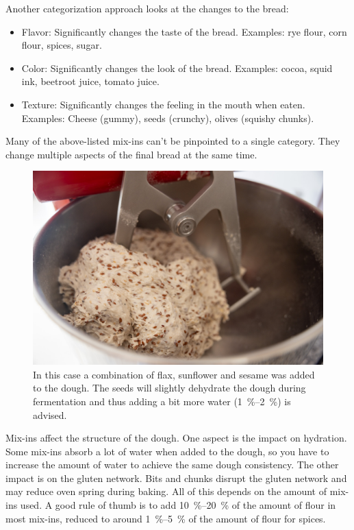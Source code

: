 Another categorization approach looks at the changes to the bread:

\begin{itemize}
  \item Flavor: Significantly changes the taste of the bread. Examples: rye
      flour, corn flour, spices, sugar.
  \item Color: Significantly changes the look of the bread. Examples: cocoa,
      squid ink, beetroot juice, tomato juice.
  \item Texture: Significantly changes the feeling in the mouth when eaten.
      Examples: Cheese (gummy), seeds (crunchy), olives (squishy chunks).
\end{itemize}

Many of the above-listed mix-ins can't be pinpointed to a single category. They
change multiple aspects of the final bread at the same time.

\begin{figure}[htb!]
  \includegraphics[width=\textwidth]{seeded-sourdough}
  \caption[Seeded sourdough]{In this case a combination of flax, sunflower and
    sesame was added to the dough. The seeds will slightly dehydrate the dough
    during fermentation and thus adding a bit more water (\qtyrange{1}{2}{\percent}) is advised.}%
\end{figure}

Mix-ins affect the structure of the dough. One aspect is the impact on
hydration. Some mix-ins absorb a lot of water when added to the dough, so you
have to increase the amount of water to achieve the same dough consistency.
The other impact is on the gluten network. Bits and chunks disrupt the gluten
network and may reduce oven spring during baking. All of this depends on the amount of mix-ins
used. A good rule of thumb is to add \qtyrange{10}{20}{\percent} of the amount
of flour in most mix-ins, reduced to around \qtyrange{1}{5}{\percent} of the
amount of flour for spices.

